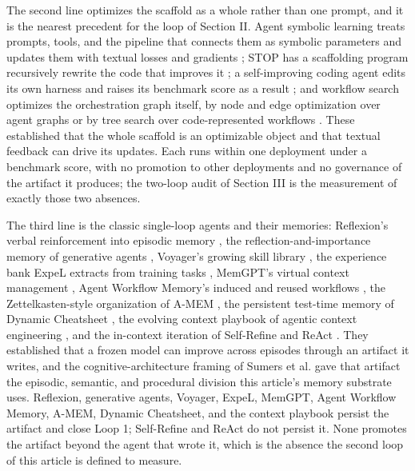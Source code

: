 \documentclass[
]{article}
\begin{document}
The second line optimizes the scaffold as a whole rather than one
prompt, and it is the nearest precedent for the loop of Section II.
Agent symbolic learning treats prompts, tools, and the pipeline that
connects them as symbolic parameters and updates them with textual
losses and gradients \cite{zhou2024symbolic}; STOP has a scaffolding
program recursively rewrite the code that improves it
\cite{zelikman2023stop}; a self-improving coding agent edits its own
harness and raises its benchmark score as a result
\cite{robeyns2025sica}; and workflow search optimizes the orchestration
graph itself, by node and edge optimization over agent graphs
\cite{zhuge2024gptswarm} or by tree search over code-represented
workflows \cite{zhang2024aflow}. These established that the whole
scaffold is an optimizable object and that textual feedback can drive
its updates. Each runs within one deployment under a benchmark score,
with no promotion to other deployments and no governance of the artifact
it produces; the two-loop audit of Section III is the measurement of
exactly those two absences.

The third line is the classic single-loop agents and their memories:
Reflexion's verbal reinforcement into episodic memory
\cite{shinn2023reflexion}, the reflection-and-importance memory of
generative agents \cite{park2023generative}, Voyager's growing skill
library \cite{wang2023voyager}, the experience bank ExpeL extracts from
training tasks \cite{zhao2024expel}, MemGPT's virtual context
management \cite{packer2023memgpt}, Agent Workflow Memory's induced and
reused workflows \cite{wang2024awm}, the Zettelkasten-style
organization of A-MEM \cite{xu2025amem}, the persistent test-time
memory of Dynamic Cheatsheet \cite{suzgun2025cheatsheet}, the evolving
context playbook of agentic context engineering \cite{ace2025agentic},
and the in-context iteration of Self-Refine and ReAct
\cite{madaan2023selfrefine, yao2023react}. They established that a
frozen model can improve across episodes through an artifact it writes,
and the cognitive-architecture framing of Sumers et al.
\cite{sumers2023coala} gave that artifact the episodic, semantic, and
procedural division this article's memory substrate uses. Reflexion,
generative agents, Voyager, ExpeL, MemGPT, Agent Workflow Memory, A-MEM,
Dynamic Cheatsheet, and the context playbook persist the artifact and
close Loop 1; Self-Refine and ReAct do not persist it. None promotes the
artifact beyond the agent that wrote it, which is the absence the second
loop of this article is defined to measure.
\end{document}
